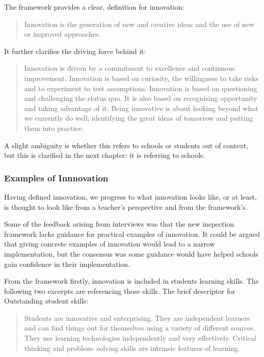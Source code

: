 The framework provides a clear, definition for innovation: \begin{quote}
Innovation is the generation of new and creative ideas and the use of new or improved approaches. 
\end{quote} \cite[p. 12]{ADEC2016}

It further clarifies the driving force behind it: 
\begin{quote}
Innovation is driven by a commitment to excellence and continuous improvement. Innovation is based on curiosity, the willingness to take risks and to experiment to test assumptions. Innovation is based on questioning and challenging the status quo. It is also based on recognising opportunity and taking advantage of it. Being innovative is about looking beyond what we currently do well, identifying the great ideas of tomorrow and putting them into practice.
\end{quote}

A slight ambiguity is whether this refers to schools or students out of context, but this is clarified in the next chapter: it is referring to schools.


\subsubsection{Examples of Innnovation}

Having defined innovation, we progress to what innovation looks like, or at least, is thought to look like from a teacher’s perspective and from the framework's.

Some of the feedback arising from interviews was that the new inspection framework lacks guidance for practical examples of innovation. It could be argued that giving concrete examples of innovation would lead to a narrow implementation, but the consensus was some guidance would have helped schools gain confidence in their implementation.

From the framework firstly, innovation is included in students learning skills. The following two excerpts are referencing those skills. The brief descriptor for Outstanding student skills: 

\begin{quote}
Students are innovative and enterprising. They are independent learners and can find things out for themselves using a variety of different sources. They use learning technologies independently and very effectively. Critical thinking and problem- solving skills are intrinsic features of learning.
\end{quote}

